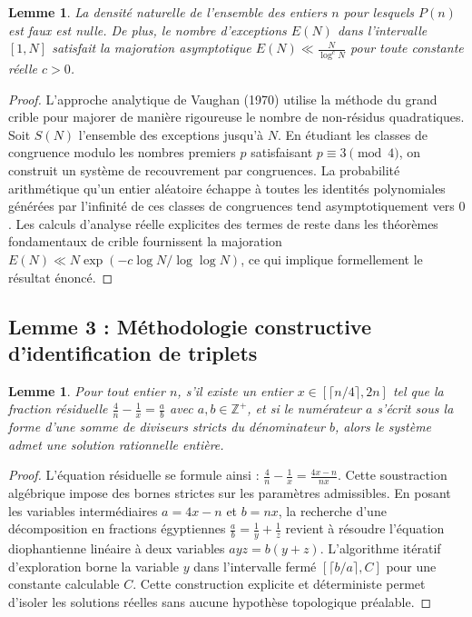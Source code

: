 \documentclass[11pt,a4paper]{article}
\newtheorem{lemma}[theorem]{Lemme}
\begin{document}
\begin{lemma}
La densité naturelle de l'ensemble des entiers $n$ pour lesquels $P(n)$ est faux est nulle. De plus, le nombre d'exceptions $E(N)$ dans l'intervalle $[1, N]$ satisfait la majoration asymptotique $E(N) \ll \frac{N}{\log^c N}$ pour toute constante réelle $c > 0$.
\end{lemma}

\begin{proof}
L'approche analytique de Vaughan (1970) utilise la méthode du grand crible pour majorer de manière rigoureuse le nombre de non-résidus quadratiques. Soit $S(N)$ l'ensemble des exceptions jusqu'à $N$. En étudiant les classes de congruence modulo les nombres premiers $p$ satisfaisant $p \equiv 3 \pmod 4$, on construit un système de recouvrement par congruences. La probabilité arithmétique qu'un entier aléatoire échappe à toutes les identités polynomiales générées par l'infinité de ces classes de congruences tend asymptotiquement vers $0$. Les calculs d'analyse réelle explicites des termes de reste dans les théorèmes fondamentaux de crible fournissent la majoration $E(N) \ll N \exp(-c \log N / \log \log N)$, ce qui implique formellement le résultat énoncé.
\end{proof}

\subsection{Lemme 3 : Méthodologie constructive d'identification de triplets}

\begin{lemma}
Pour tout entier $n$, s'il existe un entier $x \in [\lceil n/4 \rceil, 2n]$ tel que la fraction résiduelle $\frac{4}{n} - \frac{1}{x} = \frac{a}{b}$ avec $a, b \in \mathbb{Z}^{+}$, et si le numérateur $a$ s'écrit sous la forme d'une somme de diviseurs stricts du dénominateur $b$, alors le système admet une solution rationnelle entière.
\end{lemma}

\begin{proof}
L'équation résiduelle se formule ainsi : $\frac{4}{n} - \frac{1}{x} = \frac{4x-n}{nx}$. Cette soustraction algébrique impose des bornes strictes sur les paramètres admissibles. En posant les variables intermédiaires $a = 4x-n$ et $b = nx$, la recherche d'une décomposition en fractions égyptiennes $\frac{a}{b} = \frac{1}{y} + \frac{1}{z}$ revient à résoudre l'équation diophantienne linéaire à deux variables $a y z = b(y + z)$. L'algorithme itératif d'exploration borne la variable $y$ dans l'intervalle fermé $[\lceil b/a \rceil, C]$ pour une constante calculable $C$. Cette construction explicite et déterministe permet d'isoler les solutions réelles sans aucune hypothèse topologique préalable.
\end{proof}
\end{document}

